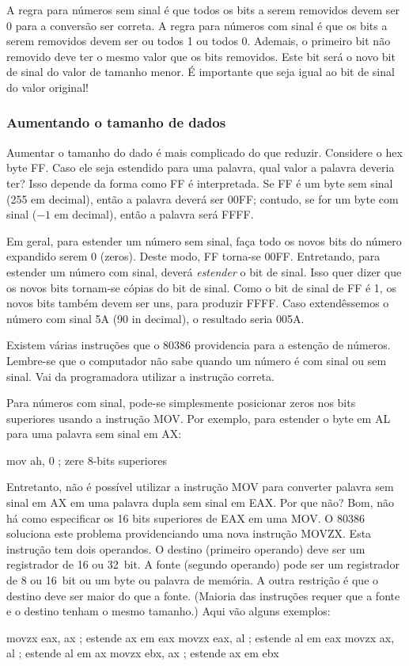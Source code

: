 A regra para números sem sinal é que todos os bits a serem removidos devem
ser 0 para a conversão ser correta. A regra para números com sinal é
que os bits a serem removidos devem ser ou todos 1 ou todos 0. Ademais,
o primeiro bit não removido deve ter o mesmo valor que os bits
removidos. Este bit será o novo bit de sinal do valor de tamanho menor.
É importante que seja igual ao bit de sinal do valor original!

\subsubsection{Aumentando o tamanho de dados}

Aumentar o tamanho do dado é mais complicado do que
reduzir. Considere o hex byte FF. Caso ele seja estendido para uma palavra,
qual valor a palavra deveria ter? Isso depende da forma como FF é
interpretada. Se FF é um byte sem sinal (255 em decimal), então a palavra
deverá ser 00FF; contudo, se for um byte com sinal ($-1$ em decimal),
então a palavra será FFFF.

Em geral, para estender um número sem sinal, faça todo os novos bits
do número expandido serem 0 (zeros). Deste modo, FF torna-se 00FF. Entretando, para estender um
número com sinal, deverá \emph{estender} o bit de sinal. 
 Isso quer dizer que os novos bits tornam-se
cópias do bit de sinal. Como o bit de sinal de FF é 1, os novos bits
também devem ser uns, para produzir FFFF. Caso extendêssemos o número com sinal 5A (90 in
decimal), o resultado seria 005A.

Existem várias instruções que o 80386 providencia para a estenção de
números. Lembre-se que o computador não sabe quando um número é com sinal
ou sem sinal. Vai da programadora utilizar a instrução correta.

Para números com sinal, pode-se simplesmente posicionar zeros nos bits superiores usando
a instrução {\code MOV}. Por exemplo, para estender o byte em AL para uma palavra 
sem sinal em AX:
\begin{AsmCodeListing}[numbers=none,frame=none]
      mov    ah, 0   ; zere 8-bits superiores
\end{AsmCodeListing}
Entretanto, não é possível utilizar a instrução {\code MOV} para
converter palavra sem sinal em AX em uma palavra dupla sem sinal em EAX. Por
que não? Bom, não há como especificar os 16 bits superiores de EAX em uma {\code
MOV}. O 80386 soluciona este problema providenciando uma nova instrução
{\code MOVZX}.  Esta instrução tem dois operandos. O destino
(primeiro operando) deve ser um registrador de 16 ou 32~bit.  A fonte (segundo
operando) pode ser um registrador de 8 ou 16~bit ou um byte ou palavra de 
memória. A outra restrição é que o destino deve ser maior do que
a fonte. (Maioria das instruções requer que a fonte e o destino tenham
o mesmo tamanho.) Aqui vão alguns exemplos:
\begin{AsmCodeListing}[numbers=none,frame=none]
      movzx  eax, ax      ; estende ax em eax
      movzx  eax, al      ; estende al em eax
      movzx  ax, al       ; estende al em ax
      movzx  ebx, ax      ; estende ax em ebx
\end{AsmCodeListing}

